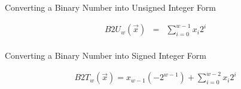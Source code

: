 \documentclass[12pt]{article}
\begin{document}
Converting a Binary Number into Unsigned Integer Form

\begin{eqnarray*}
B2U_w(\vec{x})&=&\displaystyle \sum \limits_{i=0}^{w-1} x_{i} 2^i\\
\end{eqnarray*}


Converting a Binary Number into Signed Integer Form

\begin{eqnarray*}
B2T_w( \vec{x} ) = x_{w-1} ({-2}^{w-1}) + \displaystyle \sum \limits_{i=0}^{w-2} x_{i} 2^i
\end{eqnarray*}
\end{document}
